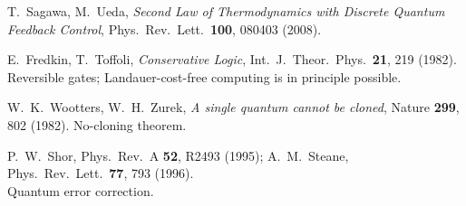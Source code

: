 \begin{description}[leftmargin=3.5em,style=sameline,itemsep=0.4em]
\item[{[B10]}] T.~Sagawa, M.~Ueda,
  \textit{Second Law of Thermodynamics with Discrete Quantum Feedback Control},
  Phys.\ Rev.\ Lett.\ \textbf{100}, 080403 (2008).

\item[{[B11]}] E.~Fredkin, T.~Toffoli,
  \textit{Conservative Logic},
  Int.\ J.\ Theor.\ Phys.\ \textbf{21}, 219 (1982). \\
  Reversible gates; Landauer-cost-free computing is in principle possible.

\item[{[B12]}] W.~K.~Wootters, W.~H.~Zurek,
  \textit{A single quantum cannot be cloned},
  Nature \textbf{299}, 802 (1982). No-cloning theorem.

\item[{[B13]}] P.~W.~Shor, Phys.\ Rev.\ A \textbf{52}, R2493 (1995);
  A.~M.~Steane, Phys.\ Rev.\ Lett.\ \textbf{77}, 793 (1996). \\
  Quantum error correction.

\end{description}

\bigskip
{}